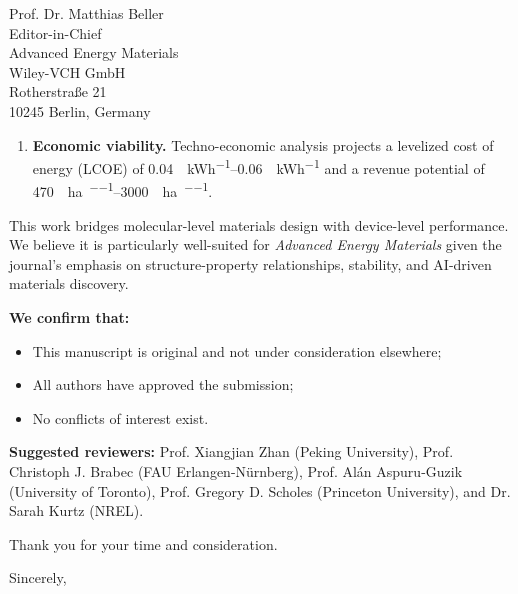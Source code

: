 \documentclass[a4paper,11pt]{letter}
\begin{document}
\begin{letter}{
Prof. Dr. Matthias Beller \\
Editor-in-Chief \\
Advanced Energy Materials \\
Wiley-VCH GmbH \\
Rotherstra\ss{}e 21 \\
10245 Berlin, Germany
}
\begin{enumerate}
    \item \textbf{Economic viability.} Techno-economic analysis projects a levelized cost of energy (LCOE) of \SIrange{0.04}{0.06}{\USD\per\kWh} and a revenue potential of \SIrange{470}{3000}{\USD\per\hectare\per\yr}. 
\end{enumerate}

This work bridges molecular-level materials design with device-level performance. We believe it is particularly well-suited for \textit{Advanced Energy Materials} given the journal's emphasis on structure-property relationships, stability, and AI-driven materials discovery.

\textbf{We confirm that:}
\begin{itemize}
    \item This manuscript is original and not under consideration elsewhere;
    \item All authors have approved the submission;
    \item No conflicts of interest exist.
\end{itemize}

\textbf{Suggested reviewers:}
Prof. Xiangjian Zhan (Peking University), Prof. Christoph J. Brabec (FAU Erlangen-N\"urnberg), Prof. Al\'an Aspuru-Guzik (University of Toronto), Prof. Gregory D. Scholes (Princeton University), and Dr. Sarah Kurtz (NREL).

Thank you for your time and consideration.

\closing{Sincerely,}


\end{letter}
\end{document}
